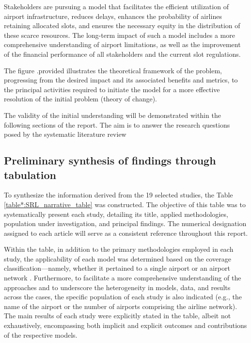 Stakeholders are pursuing a model that facilitates the efficient utilization of airport infrastructure, reduces delays, enhances the probability of airlines retaining allocated slots, and ensures the necessary equity in the distribution of these scarce resources. The long-term impact of such a model includes a more comprehensive understanding of airport limitations, as well as the improvement of the financial performance of all stakeholders and the current slot regulations. 

The figure .provided illustrates the theoretical framework of the problem, progressing from the desired impact and its associated benefits and metrics, to the principal activities required to initiate the model for a more effective resolution of the initial problem (theory of change).

The validity of the initial understanding will be demonstrated within the following sections of the report. The aim is to answer the research questions posed by the systematic literature review

%


\subsection{Preliminary synthesis of findings through tabulation}

To synthesize the information derived from the 19 selected studies, the Table \ref{table*:SRL_narrative_table} was constructed. The objective of this table was to systematically present each study, detailing its title, applied methodologies, population under investigation, and principal findings. The numerical designation assigned to each article will serve as a consistent reference throughout this report.

Within the table, in addition to the primary methodologies employed in each study, the applicability of each model was determined based on the coverage classification—namely, whether it pertained to a single airport or an airport network \cite{zografos2017increasing}. Furthermore, to facilitate a more comprehensive understanding of the approaches and to underscore the heterogeneity in models, data, and results across the cases, the specific population of each study is also indicated (e.g., the name of the airport or the number of airports comprising the airline network). The main results of each study were explicitly stated in the table, albeit not exhaustively, encompassing both implicit and explicit outcomes and contributions of the respective models.

